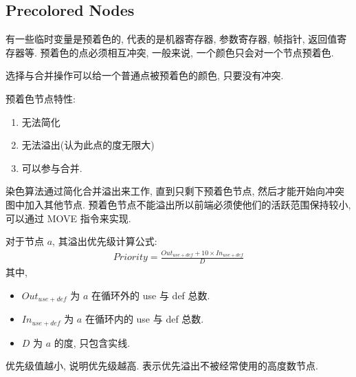 \subsection{Precolored Nodes}
有一些临时变量是预着色的, 代表的是机器寄存器, 参数寄存器, 帧指针, 返回值寄存器等. 预着色的点必须相互冲突, 一般来说, 一个颜色只会对一个节点预着色. 

选择与合并操作可以给一个普通点被预着色的颜色, 只要没有冲突. 

预着色节点特性:
\begin{enumerate}
    \item 无法简化
    \item 无法溢出(认为此点的度无限大)
    \item 可以参与合并.
\end{enumerate}

染色算法通过简化合并溢出来工作, 直到只剩下预着色节点, 然后才能开始向冲突图中加入其他节点. 预着色节点不能溢出所以前端必须使他们的活跃范围保持较小, 可以通过 MOVE 指令来实现. 

对于节点 $a$, 其溢出优先级计算公式: 
\begin{align*}
    Priority = \frac{Out_{use+def}+10\times In_{use+def}}{D}
\end{align*}
其中,
\begin{itemize}
    \item $Out_{use+def}$ 为 $a$ 在循环外的 use 与 def 总数.
    \item $In_{use+def}$ 为 $a$ 在循环内的 use 与 def 总数.
    \item $D$ 为 $a$ 的度, 只包含实线. 
\end{itemize}

优先级值越小, 说明优先级越高. 表示优先溢出不被经常使用的高度数节点. 


